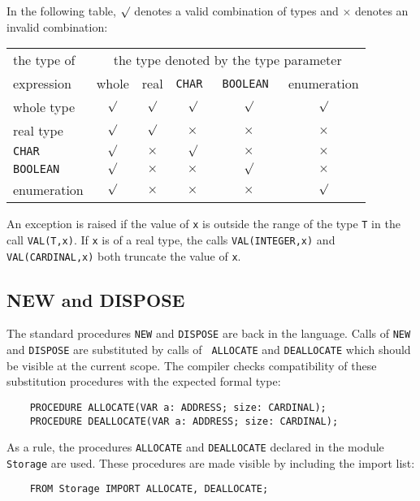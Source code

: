 In the following table, $\surd$ denotes a valid combination of types
and $\times$ denotes an invalid combination:
\begin{center}
\begin{tabular}{l|ccccc} \hline
the type of & \multicolumn{5}{c}{the type denoted by the type parameter} \\
expression  & whole   & real     & \tt CHAR &\tt BOOLEAN  & enumeration \\
\hline
whole type  & $\surd$ & $\surd$  & $\surd$  & $\surd$  & $\surd$  \\
real type   & $\surd$ & $\surd$  & $\times$ & $\times$ & $\times$ \\
\tt CHAR    & $\surd$ & $\times$ & $\surd$  & $\times$ & $\times$ \\
\tt BOOLEAN & $\surd$ & $\times$ & $\times$ & $\surd$  & $\times$ \\
enumeration & $\surd$ & $\times$ & $\times$ & $\times$ & $\surd$  \\
\end{tabular}
\end{center}

An exception is raised if the value of \verb'x' is outside the range of
the type \verb'T' in the call {\tt VAL(T,x)}. If {\tt x} is of a real type,
the calls {\tt VAL(INTEGER,x)} and {\tt VAL(CARDINAL,x)} both
truncate the value of {\tt x}.

\subsection{NEW and DISPOSE}\label{m2:ISO:NEW}

The standard procedures \verb'NEW' and \verb'DISPOSE' are back in the language.
Calls of \verb'NEW' and \verb'DISPOSE' are substituted by calls of {\tt
ALLOCATE} and {\tt DEALLOCATE} which should be visible at the
current scope. The compiler checks compatibility of these
substitution procedures with the expected formal type:

\verb'    PROCEDURE ALLOCATE(VAR a: ADDRESS; size: CARDINAL);'\\
\verb'    PROCEDURE DEALLOCATE(VAR a: ADDRESS; size: CARDINAL);'

As a rule, the procedures {\tt ALLOCATE} and {\tt DEALLOCATE} declared
in the module {\tt Storage} are used. These procedures are made
visible by including the import list:

\verb'    FROM Storage IMPORT ALLOCATE, DEALLOCATE;'

